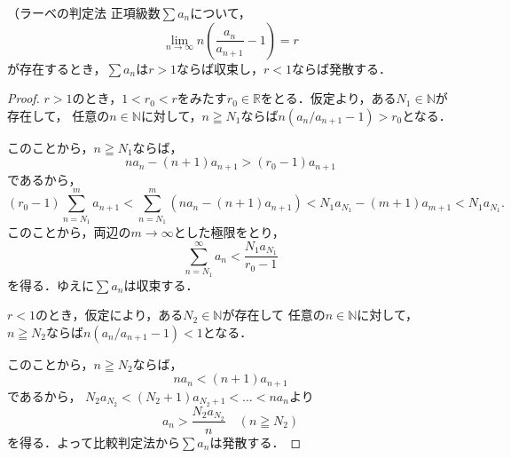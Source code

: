 \begin{lemma}{（ラーベの判定法}{}
    正項級数$\sum a_n$について，
    \[
        \lim_{n\to\infty} n \left(\frac{a_n}{a_{n+1}}-1 \right) = r
    \]
    が存在するとき，$\sum a_n$は$r >1$ならば収束し，$r < 1$ならば発散する．
\end{lemma}

\begin{proof}
    $r>1$のとき，$ 1< r_0 < r$をみたす$r_0 \in \mathbb{R}$をとる．仮定より，ある$N_1 \in \mathbb{N}$が存在して，
    任意の$n \in \mathbb{N}$に対して，$n \geqq N_1$ならば$n (a_n/a_{n+1}-1) > r_0$となる．

    このことから，$ n \geqq N_1$ならば，
    \[
        n a_n -(n+1)a_{n+1} > (r_0-1) a_{n+1}
    \]
    であるから，
    \[
        (r_0-1) \sum_{n=N_1}^{m} a_{n+1}  < \sum_{n=N_1}^{m} (n a_n - (n+1) a_{n+1})
        <N_1 a_{N_1} - (m+1) a_{m+1}
        < N_1 a_{N_1}.
    \]
    このことから，両辺の$m \to \infty$とした極限をとり，
    \[
        \sum_{n=N_1}^{\infty} a_n <\frac{N_1 a_{N_1}}{r_0-1}
    \]
    を得る．ゆえに$\sum a_n$は収束する．

    $r < 1$のとき，仮定により，ある$N_2 \in \mathbb{N}$が存在して
    任意の$n \in \mathbb{N}$に対して，$n \geqq N_2$ならば$n(a_n/a_{n+1}-1) < 1$となる．

    このことから，$n \geqq N_2$ならば，
    \[
        n a_n < (n+1) a_{n+1}
    \]
    であるから， $N_2 a_{N_2} < (N_2 +1)a_{N_2+1} <  \dots< n a_n $より
    \[
        a_n > \frac{N_2 a_{N_2}}{n} \quad (n \geqq N_2)
    \]
    を得る．よって比較判定法から$\sum a_n$は発散する．
\end{proof}

